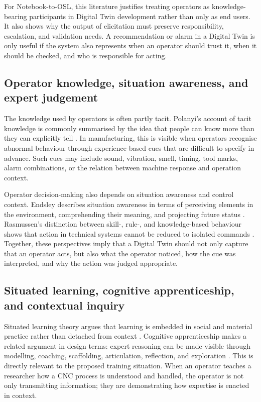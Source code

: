 For Notebook-to-OSL, this literature justifies treating operators as knowledge-bearing participants in Digital Twin development rather than only as end users. It also shows why the output of elicitation must preserve responsibility, escalation, and validation needs. A recommendation or alarm in a Digital Twin is only useful if the system also represents when an operator should trust it, when it should be checked, and who is responsible for acting.

\subsection{Operator knowledge, situation awareness, and expert judgement}

The knowledge used by operators is often partly tacit. Polanyi's account of tacit knowledge is commonly summarised by the idea that people can know more than they can explicitly tell \cite{polanyi1966tacit}. In manufacturing, this is visible when operators recognise abnormal behaviour through experience-based cues that are difficult to specify in advance. Such cues may include sound, vibration, smell, timing, tool marks, alarm combinations, or the relation between machine response and operation context.

Operator decision-making also depends on situation awareness and control context. Endsley describes situation awareness in terms of perceiving elements in the environment, comprehending their meaning, and projecting future status \cite{endsley1995situation}. Rasmussen's distinction between skill-, rule-, and knowledge-based behaviour shows that action in technical systems cannot be reduced to isolated commands \cite{rasmussen1983skills}. Together, these perspectives imply that a Digital Twin should not only capture that an operator acts, but also what the operator noticed, how the cue was interpreted, and why the action was judged appropriate.

\subsection{Situated learning, cognitive apprenticeship, and contextual inquiry}

Situated learning theory argues that learning is embedded in social and material practice rather than detached from context \cite{lave1991situated}. Cognitive apprenticeship makes a related argument in design terms: expert reasoning can be made visible through modelling, coaching, scaffolding, articulation, reflection, and exploration \cite{collins1989cognitive}. This is directly relevant to the proposed training situation. When an operator teaches a researcher how a CNC process is understood and handled, the operator is not only transmitting information; they are demonstrating how expertise is enacted in context.

